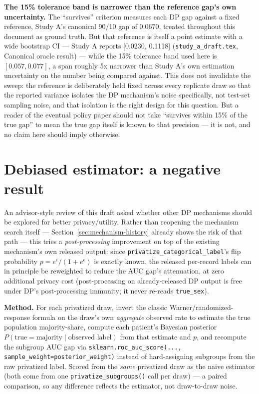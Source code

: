 \documentclass[11pt]{article}
\begin{document}
\textbf{The 15\% tolerance band is narrower than the reference gap's own uncertainty.} The ``survives'' criterion measures each DP gap against a fixed reference, Study A's canonical 90/10 gap of 0.0670, treated throughout this document as ground truth. But that reference is itself a point estimate with a wide bootstrap CI --- Study A reports [0.0230, 0.1118] (\texttt{study\_a\_draft.tex}, Canonical oracle result) --- while the 15\% tolerance band used here is $[0.057, 0.077]$, a span roughly 5x narrower than Study A's own estimation uncertainty on the number being compared against. This does not invalidate the sweep: the reference is deliberately held fixed across every replicate draw so that the reported variance isolates the DP mechanism's noise specifically, not test-set sampling noise, and that isolation is the right design for this question. But a reader of the eventual policy paper should not take ``survives within 15\% of the true gap'' to mean the true gap itself is known to that precision --- it is not, and no claim here should imply otherwise.

\section{Debiased estimator: a negative result}
\label{sec:debiased}

An advisor-style review of this draft asked whether other DP mechanisms should be explored for better privacy/utility. Rather than reopening the mechanism search itself --- Section~\ref{sec:mechanism-history} already shows the risk of that path --- this tries a \emph{post-processing} improvement on top of the existing mechanism's own released output: since \texttt{privatize\_categorical\_label}'s flip probability $p = e^\epsilon/(1+e^\epsilon)$ is exactly known, the released per-record labels can in principle be reweighted to reduce the AUC gap's attenuation, at zero additional privacy cost (post-processing on already-released DP output is free under DP's post-processing immunity; it never re-reads \texttt{true\_sex}).

\textbf{Method.} For each privatized draw, invert the classic Warner/randomized-response formula on the draw's own \emph{aggregate} observed rate to estimate the true population majority-share, compute each patient's Bayesian posterior $P(\text{true}=\text{majority} \mid \text{observed label})$ from that estimate and $p$, and recompute the subgroup AUC gap via \texttt{sklearn.roc\_auc\_score(..., sample\_weight=posterior\_weight)} instead of hard-assigning subgroups from the raw privatized label. Scored from the \emph{same} privatized draw as the naive estimator (both come from one \texttt{privatize\_subgroups()} call per draw) --- a paired comparison, so any difference reflects the estimator, not draw-to-draw noise.
\end{document}
